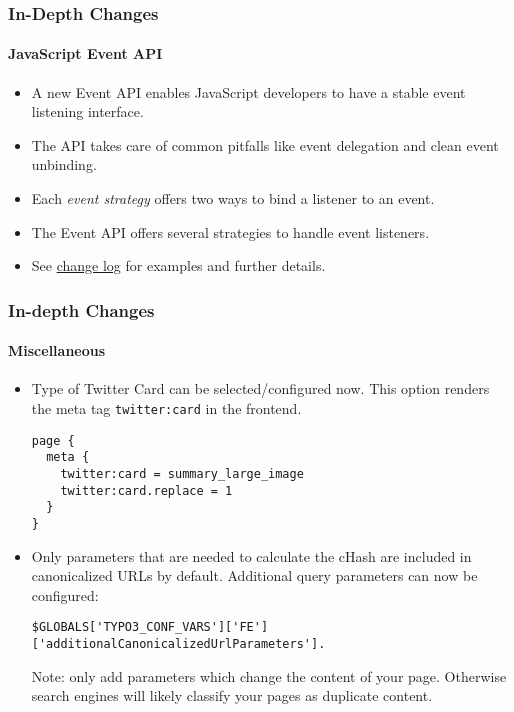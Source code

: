 
\begin{frame}[fragile]
	\frametitle{In-Depth Changes}
	\framesubtitle{JavaScript Event API}

	\begin{itemize}
		\item A new Event API enables JavaScript developers to have a stable event listening interface.
		\item The API takes care of common pitfalls like event delegation and clean event unbinding.
		\item Each \textit{event strategy} offers two ways to bind a listener to an event.
		\item The Event API offers several strategies to handle event listeners.
		\item See
			\href{https://docs.typo3.org/c/typo3/cms-core/master/en-us/Changelog/10.3/Feature-90471-JavaScriptEventAPI.html}{change log}
			for examples and further details.
	\end{itemize}

\end{frame}


\begin{frame}[fragile]
	\frametitle{In-depth Changes}
	\framesubtitle{Miscellaneous}

	\lstset{basicstyle=\tiny\ttfamily}

	\begin{itemize}

		\item Type of Twitter Card can be selected/configured now.
			This option renders the meta tag \texttt{twitter:card} in the frontend.
\begin{lstlisting}
page {
  meta {
    twitter:card = summary_large_image
    twitter:card.replace = 1
  }
}
\end{lstlisting}

		\item Only parameters that are needed to calculate the cHash are included in canonicalized URLs by default.
			Additional query parameters can now be configured:
\begin{lstlisting}
$GLOBALS['TYPO3_CONF_VARS']['FE']['additionalCanonicalizedUrlParameters'].
\end{lstlisting}

		\smaller
			Note: only add parameters which change the content of your page. Otherwise search engines will likely classify your pages as duplicate content.
		\normalsize

	\end{itemize}

\end{frame}

